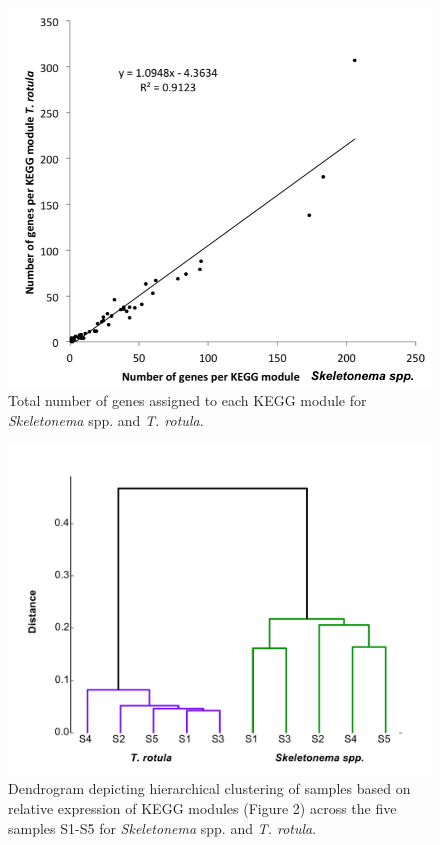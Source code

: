 \begin{figure}[p!]
  \centering
    \includegraphics[width=1\textwidth]{Images/C3_SFigure2_KEGGModuleGeneContent2.png}
    \caption[Comparison of KEGG module content between \textit{Skeletonema} spp. and \textit{T. rotula} ]{Total number of genes assigned to each KEGG module for \textit{Skeletonema} spp. and \textit{T. rotula}.}
  \label{fig:a3f2}
\end{figure}


\begin{figure}[p!]
  \centering
    \includegraphics[width=1\textwidth]{Images/C3_SFigure3_Dendrogram.pdf}
    \caption[Hierarchical clustering of QMF signatures across species and samples]{Dendrogram depicting hierarchical clustering of samples based on relative expression of KEGG modules (Figure 2) across the five samples S1-S5 for \textit{Skeletonema} spp. and \textit{T. rotula}.}
  \label{fig:a3f3}
\end{figure}

